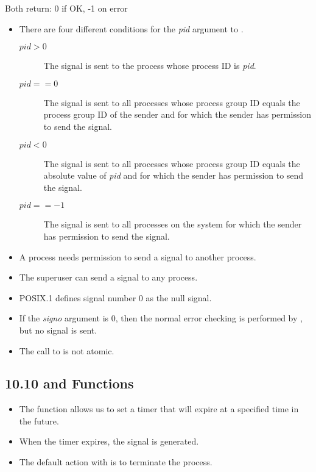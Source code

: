 \documentclass[]{article}
\begin{document}


Both return: 0 if OK, -1 on error

\begin{itemize}
\item There are four different conditions for the \emph{pid} argument to
.
\begin{description}
\item[$pid > 0$] The signal is sent to the process whose process ID is
\emph{pid}.
\item[$pid == 0$] The signal is sent to all processes whose process group ID
equals the process group ID of the sender and for which the sender has
permission to send the signal.
\item[$pid < 0$] The signal is sent to all processes whose process group ID
equals the absolute value of \emph{pid} and for which the sender has permission
to send the signal.
\item[$pid == -1$] The signal is sent to all processes on the system for which
the sender has permission to send the signal.
\end{description}
\item A process needs permission to send a signal to another process.
\item The superuser can send a signal to any process.
\item POSIX.1 defines signal number 0 as the null signal.
\item If the \emph{signo} argument is 0, then the normal error checking is
performed by , but no signal is sent.
\item The call to  is not atomic.
\end{itemize}

\subsection*{10.10  and  Functions}
\begin{itemize}
\item The  function allows us to set a timer that will expire at a
specified time in the future.
\item When the timer expires, the  signal is generated.
\item The default action with  is to terminate the process.
\end{itemize}
\end{document}

